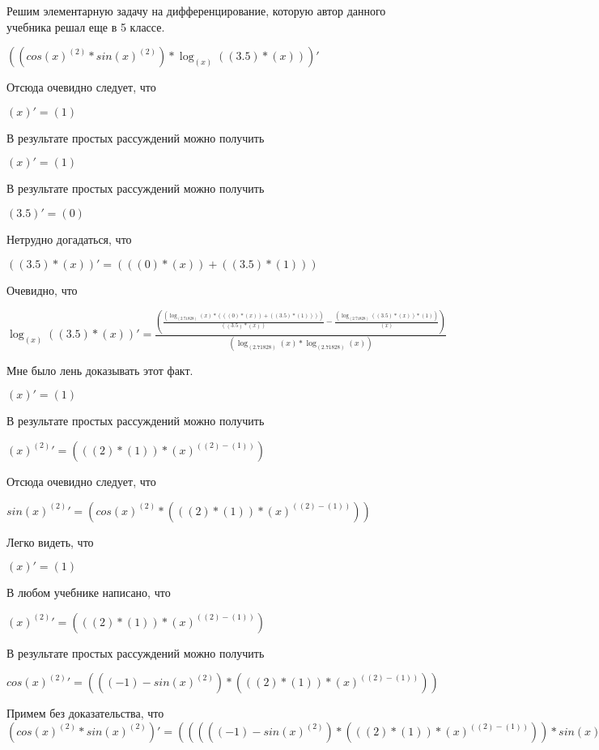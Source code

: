 \documentclass[12pt,a4paper,fleqn]{article}
\theoremstyle{definition}
\begin{document}
Решим элементарную задачу на дифференцирование, которую автор данного учебника решал еще в 5 классе.


$((cos{( x )}^{( 2 )} * sin{( x )}^{( 2 )}) * \log_{( x )}{(( 3.5 ) * ( x ))})'$

Отсюда очевидно следует, что

$( x )' = ( 1 )$

В результате простых рассуждений можно получить

$( x )' = ( 1 )$

В результате простых рассуждений можно получить

$( 3.5 )' = ( 0 )$

Нетрудно догадаться, что

$(( 3.5 ) * ( x ))' = ((( 0 ) * ( x )) + (( 3.5 ) * ( 1 )))$

Очевидно, что

$\log_{( x )}{(( 3.5 ) * ( x ))}' = \frac{(\frac{(\log_{( 2.71828 )}{( x )} * ((( 0 ) * ( x )) + (( 3.5 ) * ( 1 ))))}{(( 3.5 ) * ( x ))}
 - \frac{(\log_{( 2.71828 )}{(( 3.5 ) * ( x ))} * ( 1 ))}{( x )}
)}{(\log_{( 2.71828 )}{( x )} * \log_{( 2.71828 )}{( x )})}
$

Мне было лень доказывать этот факт.

$( x )' = ( 1 )$

В результате простых рассуждений можно получить

${( x )}^{( 2 )}' = ((( 2 ) * ( 1 )) * {( x )}^{(( 2 ) - ( 1 ))})$

Отсюда очевидно следует, что

$sin{( x )}^{( 2 )}' = (cos{( x )}^{( 2 )} * ((( 2 ) * ( 1 )) * {( x )}^{(( 2 ) - ( 1 ))}))$

Легко видеть, что

$( x )' = ( 1 )$

В любом учебнике написано, что

${( x )}^{( 2 )}' = ((( 2 ) * ( 1 )) * {( x )}^{(( 2 ) - ( 1 ))})$

В результате простых рассуждений можно получить

$cos{( x )}^{( 2 )}' = ((( -1 ) - sin{( x )}^{( 2 )}) * ((( 2 ) * ( 1 )) * {( x )}^{(( 2 ) - ( 1 ))}))$

Примем без доказательства, что
$(cos{( x )}^{( 2 )} * sin{( x )}^{( 2 )})' = ((((( -1 ) - sin{( x )}^{( 2 )}) * ((( 2 ) * ( 1 )) * {( x )}^{(( 2 ) - ( 1 ))})) * sin{( x )}^{( 2 )}) + (cos{( x )}^{( 2 )} * (cos{( x )}^{( 2 )} * ((( 2 ) * ( 1 )) * {( x )}^{(( 2 ) - ( 1 ))}))))$
\end{document}
